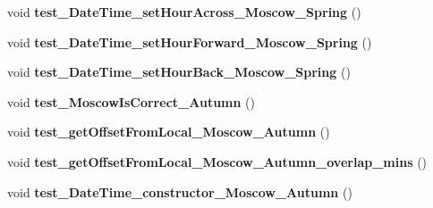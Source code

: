 \begin{DoxyCompactItemize}
\item 
\hypertarget{classorg_1_1joda_1_1time_1_1_test_date_time_zone_cutover_a0da92fb392b0f72cf7f0160cc166f3b8}{void {\bfseries test\-\_\-\-Date\-Time\-\_\-set\-Hour\-Across\-\_\-\-Moscow\-\_\-\-Spring} ()}\label{classorg_1_1joda_1_1time_1_1_test_date_time_zone_cutover_a0da92fb392b0f72cf7f0160cc166f3b8}

\item 
\hypertarget{classorg_1_1joda_1_1time_1_1_test_date_time_zone_cutover_a8915644a80071cc3f7d418e2d1d772e1}{void {\bfseries test\-\_\-\-Date\-Time\-\_\-set\-Hour\-Forward\-\_\-\-Moscow\-\_\-\-Spring} ()}\label{classorg_1_1joda_1_1time_1_1_test_date_time_zone_cutover_a8915644a80071cc3f7d418e2d1d772e1}

\item 
\hypertarget{classorg_1_1joda_1_1time_1_1_test_date_time_zone_cutover_ad2c4ad1759c0195d178f0867763e6292}{void {\bfseries test\-\_\-\-Date\-Time\-\_\-set\-Hour\-Back\-\_\-\-Moscow\-\_\-\-Spring} ()}\label{classorg_1_1joda_1_1time_1_1_test_date_time_zone_cutover_ad2c4ad1759c0195d178f0867763e6292}

\item 
\hypertarget{classorg_1_1joda_1_1time_1_1_test_date_time_zone_cutover_af39cfb3676a623bc2b6baae371453b6e}{void {\bfseries test\-\_\-\-Moscow\-Is\-Correct\-\_\-\-Autumn} ()}\label{classorg_1_1joda_1_1time_1_1_test_date_time_zone_cutover_af39cfb3676a623bc2b6baae371453b6e}

\item 
\hypertarget{classorg_1_1joda_1_1time_1_1_test_date_time_zone_cutover_a120632185673f805f4613932e6267b44}{void {\bfseries test\-\_\-get\-Offset\-From\-Local\-\_\-\-Moscow\-\_\-\-Autumn} ()}\label{classorg_1_1joda_1_1time_1_1_test_date_time_zone_cutover_a120632185673f805f4613932e6267b44}

\item 
\hypertarget{classorg_1_1joda_1_1time_1_1_test_date_time_zone_cutover_a4ef2f04b18f34b4993c5e389e27107b6}{void {\bfseries test\-\_\-get\-Offset\-From\-Local\-\_\-\-Moscow\-\_\-\-Autumn\-\_\-overlap\-\_\-mins} ()}\label{classorg_1_1joda_1_1time_1_1_test_date_time_zone_cutover_a4ef2f04b18f34b4993c5e389e27107b6}

\item 
\hypertarget{classorg_1_1joda_1_1time_1_1_test_date_time_zone_cutover_ac18861dc0cb421623450f83aa23bde4d}{void {\bfseries test\-\_\-\-Date\-Time\-\_\-constructor\-\_\-\-Moscow\-\_\-\-Autumn} ()}\label{classorg_1_1joda_1_1time_1_1_test_date_time_zone_cutover_ac18861dc0cb421623450f83aa23bde4d}


\end{DoxyCompactItemize}
